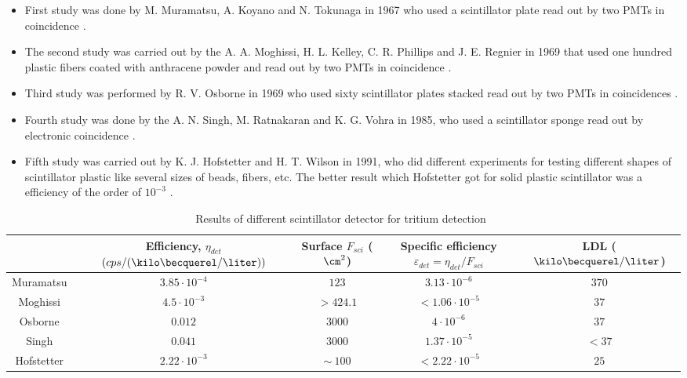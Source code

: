 \begin{itemize}

\item{} First study was done by M. Muramatsu, A. Koyano and N. Tokunaga in 1967 who used a scintillator plate read out by two PMTs in coincidence \cite{Muramatsu}.

\item{} The second study was carried out by the A. A. Moghissi, H. L. Kelley, C. R. Phillips and J. E. Regnier in 1969 that used one hundred plastic fibers coated with anthracene powder and read out by two PMTs in coincidence \cite{Moghissi}.

\item{} Third study was performed by R. V. Osborne in 1969 who used sixty scintillator plates stacked read out by two PMTs in coincidences \cite{Osborne}.

\item{} Fourth study was done by the A. N. Singh, M. Ratnakaran and K. G. Vohra in 1985, who used a scintillator sponge read out by electronic coincidence \cite{Ratnakaran}\cite{Ratnakaran2000}.

\item{} Fifth study was carried out by K. J. Hofstetter and H. T. Wilson in 1991, who did different experiments for testing different shapes of scintillator plastic like several sizes of beads, fibers, etc. The better result which Hofstetter got for solid plastic scintillator was a efficiency of the order of $10^{-3}$ \cite{Hofstetter1}\cite{Hofstetter2}.

\end{itemize}

\begin{table}[htbp]
\begin{center}
\begin{tabular}{|c|c|c|c|c|}
\hline
 & \parbox{6em}{\centering Efficiency, $\eta_{det}$\\ $(cps/(\kilo\becquerel/\liter))$}  & \parbox{5em}{\centering Surface\\ $F_{sci}$ ($\cm^2$)}  & \parbox{5em}{\centering Specific efficiency\\ $\varepsilon_{det}=\eta_{det}/F_{sci}$} & LDL ($\kilo\becquerel/\liter$)\\
\hline \hline \hline
Muramatsu & $3.85 \cdot 10^{-4}$ & $123$ & $3.13 \cdot 10^{-6}$ & $370$ \\ \hline
Moghissi & $4.5 \cdot 10^{-3}$ & $>424.1$ & $<1.06 \cdot 10^{-5}$ & $37$ \\ \hline
Osborne & $0.012$ & $3000$ & $4 \cdot 10^{-6}$ & $37$ \\ \hline
Singh & $0.041$ & $3000$ & $1.37 \cdot 10^{-5}$ & $<37$ \\ \hline
Hofstetter & $2.22 \cdot 10^{-3}$ & $\sim~100$ & $<2.22 \cdot 10^{-5}$ & $25$ \\ \hline
\end{tabular}
\caption{Results of different scintillator detector for tritium detection~\cite{TesisTritio}}
\label{PlasticScinTritium}
\end{center}
\end{table}

